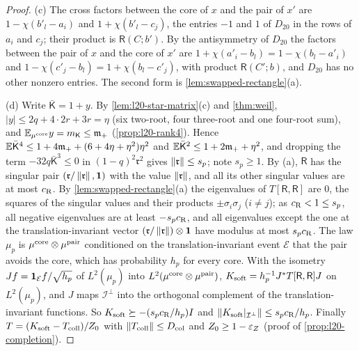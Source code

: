 \begin{proof}
(c) The cross factors between the core of $x$ and the pair of $x'$ are
$1-\chi(b'_l-a_i)$ and $1+\chi(b'_l-c_j)$, the entries $-1$ and $1$ of $D_{20}$
in the rows of $a_i$ and $c_j$; their product is $\mathsf R(C;b')$. By the
antisymmetry of $D_{20}$ the factors between the pair of $x$ and the core of
$x'$ are $1+\chi(a'_i-b_l)=1-\chi(b_l-a'_i)$ and $1-\chi(c'_j-b_l)=1+\chi(b_l-c'_j)$,
with product $\mathsf R(C';b)$, and $D_{20}$ has no other nonzero entries. The
second form is \cref{lem:swapped-rectangle}(a).

(d) Write $\bar{\mathsf K}=1+y$. By \cref{lem:l20-star-matrix}(c) and
\cref{thm:weil}, $|y|\le2q+4\cdot2r+3r=\eta$ (six two-root, four three-root and
one four-root sum), and $\mathbb E_{\mu^{\rm core}}y=m_{\mathsf K}\le\mathfrak m_+$
(\cref{prop:l20-rank4}). Hence
$\mathbb E\bar{\mathsf K}^4\le1+4\mathfrak m_++(6+4\eta+\eta^2)\eta^2$ and
$\mathbb E\bar{\mathsf K}^2\le1+2\mathfrak m_++\eta^2$, and dropping the term
$-32q\bar{\mathsf K}^3\le0$ in $(1-q)^2\mathfrak r^2$ gives
$\left\|\mathfrak r\right\|\le s_p$; note $s_p\ge1$. By (a), $\mathsf R$ has the singular
pair $(\mathfrak r/\left\|\mathfrak r\right\|,\mathbf 1)$ with the value $\left\|\mathfrak r\right\|$,
and all its other singular values are at most $c_{\rm R}$. By
\cref{lem:swapped-rectangle}(a) the eigenvalues of $T[\mathsf R,\mathsf R]$ are
$0$, the squares of the singular values and their products $\pm\sigma_i\sigma_j$
($i\ne j$); as $c_{\rm R}<1\le s_p$, all negative eigenvalues are at least
$-s_pc_{\rm R}$, and all eigenvalues except the one at the translation-invariant
vector $(\mathfrak r/\left\|\mathfrak r\right\|)\otimes\mathbf 1$ have modulus at most
$s_pc_{\rm R}$. The law $\mu_p$ is $\mu^{\rm core}\otimes\mu^{\rm pair}$ conditioned on
the translation-invariant event $\mathcal E$ that the pair avoids the core,
which has probability $h_p$ for every core. With the isometry
$Jf=\mathbf 1_{\mathcal E}f/\sqrt{h_p}$ of $L^2(\mu_p)$ into
$L^2(\mu^{\rm core}\otimes\mu^{\rm pair})$, $K_{\rm soft}=h_p^{-1}J^*T[\mathsf R,\mathsf R]J$
on $L^2(\mu_p)$, and $J$ maps $\mathcal I^\perp$ into the orthogonal complement
of the translation-invariant functions. So $K_{\rm soft}\succeq-(s_pc_{\rm R}/h_p)I$
and $\left\|K_{\rm soft}|_{\mathcal I^\perp}\right\|\le s_pc_{\rm R}/h_p$. Finally
$T=(K_{\rm soft}-T_{\rm coll})/Z_0$ with $\left\|T_{\rm coll}\right\|\le D_{\rm col}$ and
$Z_0\ge1-\varepsilon_Z$ (proof of \cref{prop:l20-completion}).
\end{proof}



